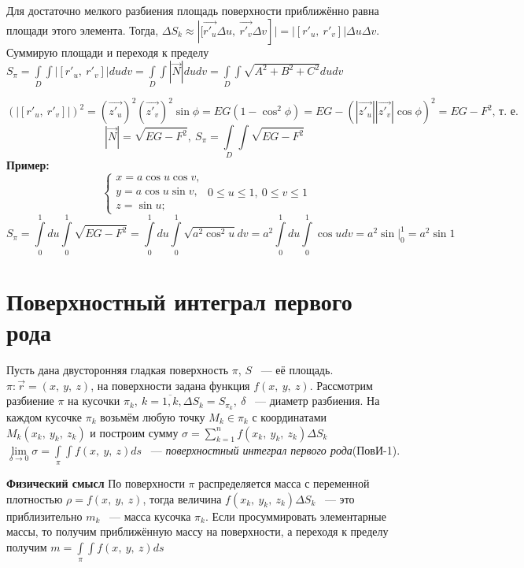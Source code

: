 \documentclass[../../main.tex]{subfiles}
\begin{document}
Для достаточно мелкого разбиения площадь поверхности приближённо равна площади этого элемента. Тогда, $\Delta S_k \approx \left|[\vec{r'_u}\Delta u, \ \vec{r'_v}\Delta v\right]| = |\left[r'_u, \ r'_v\right]|\Delta u\Delta v$. Суммирую площади и переходя к пределу $S_\pi = \int\limits_D\int|\left[r'_u, \ r'_v\right]|dudv = \int\limits_D\int|\vec{N}|dudv = \int\limits_D\int\sqrt{A^2+B^2+C^2}dudv$

\[
(|\left[r'_u, \ r'_v\right]|)^2 = (\vec{z'_u})^2(\vec{z'_v})^2\sin\phi = EG(1 - \cos^2\phi) = EG - (|\vec{z'_u}||\vec{z'_v}|\cos\phi)^2 = EG-F^2\text{, т.~е.}
\]
\[
|\vec{N}| = \sqrt{EG - F^2}, \ S_\pi = \int\limits_D\int\sqrt{EG - F^2}
\]
\textbf{Пример:}\\
\[
\begin{cases}
 x = a\cos u\cos v, \\
 y = a\cos u\sin v,\\
 z = \sin u;
\end{cases} \ 
0 \leq u \leq 1, \ 0 \leq v \leq 1
\]
\[
 S_\pi = \int\limits_0^1du\int\limits_0^1\sqrt{EG-F^2} = \int\limits_0^1du\int\limits_0^1\sqrt{a^2\cos^2u}dv = a^2\int\limits_0^1du\int\limits_0^1\cos udv = a^2\sin\big|_0^1 = a^2\sin 1
\]
\section{Поверхностный интеграл первого рода}

Пусть дана двусторонняя гладкая поверхность $\pi$, $S$ ~--- её площадь. $\pi : \vec{r} = (x, \ y, \ z)$, на поверхности задана функция $f(x, \ y, \ z)$. Рассмотрим разбиение $\pi$ на кусочки $\pi_k, \ k = \overline{1, k}, \Delta S_k = S_{\pi_k}, \ \delta$ ~--- диаметр разбиения. На каждом кусочке $\pi_k$ возьмём любую точку $M_k \in \pi_k$ с координатами $M_k(x_k, \ y_k, \ z_k)$ и построим сумму $\sigma = \sum\limits_{k = 1}^nf(x_k, \ y_k, \ z_k)\Delta S_k$\\
$\lim\limits_{\delta\rightarrow0}\sigma = \int\limits_\pi\int f(x, \ y, \ z)ds$ ~--- \emph{поверхностный интеграл первого рода}(ПовИ-1).

\textbf{Физический смысл}
По поверхности $\pi$ распределяется масса с переменной плотностью $\rho = f(x, \ y, \ z)$, тогда величина $f(x_k, \ y_k, \ z_k)\Delta S_k$ ~--- это приблизительно $m_k$ ~--- масса кусочка $\pi_k$. Если просуммировать элементарные массы, то получим приближённую массу на поверхности, а переходя к пределу получим $m = \int\limits_\pi\int f(x, \ y, \ z)ds$
\end{document}
